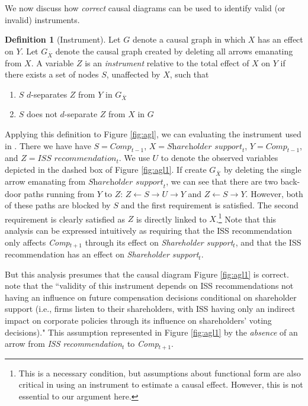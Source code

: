 \documentclass[12pt,reqno,titlepage]{amsart}
\theoremstyle{definition}
\newtheorem{definition}{Definition}
\begin{document}
We now discuss how \emph{correct} causal diagrams can be used to identify valid (or invalid) instruments.
 
\begin{definition}[Instrument]
Let $G$ denote a causal graph in which $X$ has an effect on $Y$. 
Let $G_{\overline{X}}$ denote the causal graph created by deleting all arrows emanating from $X$.
A variable $Z$ is an \emph{instrument} relative to the total effect of $X$ on $Y$ if there exists a set of nodes $S$, unaffected by $X$, such that
\begin{enumerate}
\item $S$ $d$-separates $Z$ from $Y$ in $G_{\overline{X}}$
\item $S$ does not $d$-separate $Z$ from $X$ in $G$
\end{enumerate}
\end{definition}

Applying this definition to Figure \ref{fig:agl}, we can evaluating the instrument used in \citet{Armstrong:2013io}.
There we have have $S = \textit{Comp}_{t-1}$,
$X =\textit{Shareholder support}_{t}$, $Y = \textit{Comp}_{t-1}$, and $Z = \textit{ISS recommendation}_{t}$.
We use $U$ to denote the observed variables depicted in the dashed box of Figure \ref{fig:agl1}.
If create $G_{\overline{X}}$ by deleting the single arrow emanating from $\textit{Shareholder support}_{t}$, we can see that there are two back-door paths running from $Y$ to $Z$: 
$Z \leftarrow S \rightarrow U \rightarrow Y$ and $Z \leftarrow S \rightarrow Y$.
However, both of these paths are blocked by $S$ and the first requirement is satisfied.
The second requirement is clearly satisfied as $Z$ is directly linked to $X$.\footnote{
This is a necessary condition, but assumptions about functional form are also critical in using an instrument to estimate a causal effect.
However, this is not essential to our argument here.}
%
Note that this analysis can be expressed intuitively as requiring that the ISS recommendation only affects \textit{Comp}$_{t+1}$ through its effect on \textit{Shareholder support}$_{t}$, and that the ISS recommendation has an effect on \textit{Shareholder support}$_{t}$.

But this analysis presumes that the causal diagram Figure \ref{fig:agl1} is correct.
\citet[p.\,912]{Armstrong:2013io} note that the ``validity of this instrument depends on ISS recommendations not having an influence on future compensation decisions conditional on shareholder support (i.e., firms listen to their shareholders, with ISS having only an indirect impact on corporate policies through its influence on shareholders' voting decisions)."
This assumption represented in Figure \ref{fig:agl1} by the \emph{absence} of an arrow from \textit{ISS recommendation}$_t$ to \textit{Comp}$_{t+1}$.
\end{document}
